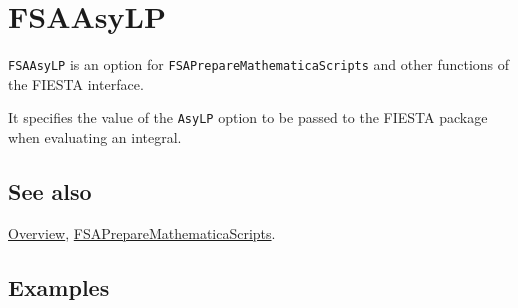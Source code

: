 \documentclass[../FeynHelpersManual.tex]{subfiles}
\begin{document}
\hypertarget{fsaasylp}{
\section{FSAAsyLP}\label{fsaasylp}}

\texttt{FSAAsyLP} is an option for \texttt{FSAPrepareMathematicaScripts}
and other functions of the FIESTA interface.

It specifies the value of the \texttt{AsyLP} option to be passed to the
FIESTA package when evaluating an integral.

\subsection{See also}

\hyperlink{toc}{Overview},
\hyperlink{fsapreparemathematicascripts}{FSAPrepareMathematicaScripts}.

\subsection{Examples}
\end{document}
